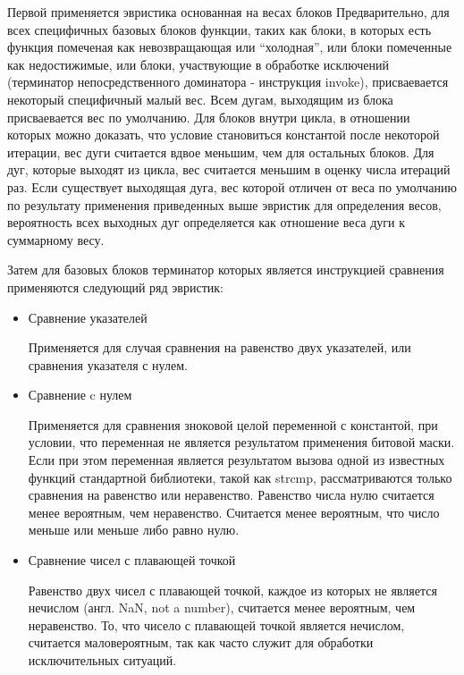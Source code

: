 Первой применяется эвристика основанная на весах блоков
Предварительно, для всех специфичных базовых блоков функции, таких как блоки, в которых есть функция помеченая как невозвращающая или \enquote{холодная}, или блоки помеченные как недостижимые, или блоки, участвующие в обработке исключений (терминатор непосредственного доминатора - инструкция invoke), присваевается некоторый специфичный малый вес.
Всем дугам, выходящим из блока присваевается вес по умолчанию.
Для блоков внутри цикла, в отношении которых можно доказать, что условие становиться константой после некоторой итерации, вес дуги считается вдвое меньшим, чем для остальных блоков.
Для дуг, которые выходят из цикла, вес считается меньшим в оценку числа итераций раз.
Если существует выходящая дуга, вес которой отличен от веса по умолчанию по результату применения приведенных выше эвристик для определения весов, вероятность всех выходных дуг определяется как отношение веса дуги к суммарному весу.

Затем для базовых блоков терминатор которых является инструкцией сравнения применяются следующий ряд эвристик:
\begin{itemize}
    \item Сравнение указателей

        Применяется для случая сравнения на равенство двух указателей, или сравнения указателя с нулем.

    \item Сравнение c нулем

        Применяется для сравнения зноковой целой переменной с константой, при условии, что переменная не является результатом применения битовой маски.
        Если при этом переменная является результатом вызова одной из известных функций стандартной библиотеки, такой как strcmp, рассматриваются только сравнения на равенство или неравенство.
        Равенство числа нулю считается менее вероятным, чем неравенство.
        Считается менее вероятным, что число меньше или меньше либо равно нулю.

    \item Сравнение чисел с плавающей точкой

        Равенство двух чисел с плавающей точкой, каждое из которых не является нечислом (англ. NaN, not a number), считается менее вероятным, чем неравенство.
        То, что чисело с плавающей точкой является нечислом, считается маловероятным, так как часто служит для обработки исключительных ситуаций.

\end{itemize}

